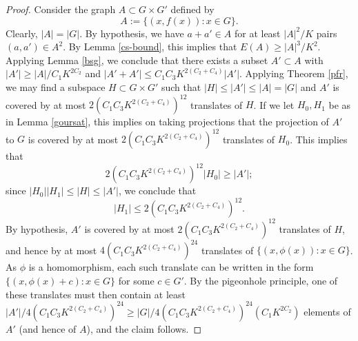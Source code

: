 \begin{proof} Consider the graph $A \subset G \times G'$ defined by
$$ A := \{ (x,f(x)): x \in G \}.$$
Clearly, $|A| = |G|$.  By hypothesis, we have $a+a' \in A$ for at least $|A|^2/K$ pairs $(a,a') \in A^2$.  By Lemma \ref{cs-bound}, this implies that $E(A) \geq |A|^3/K^2$.  Applying Lemma \ref{bsg}, we conclude that there exists a subset $A' \subset A$ with $|A'| \geq |A|/C_1 K^{2C_2}$ and $|A'+A'| \leq C_1C_3 K^{2(C_2+C_4)} |A'|$.  Applying Theorem \ref{pfr}, we may find a subspace $H \subset G \times G'$ such that $|H| \leq |A'| \leq |A| = |G|$ and $A'$ is covered by at most $2 (C_1C_3 K^{2(C_2+C_4)})^{12}$ translates of $H$.  If we let $H_0,H_1$ be as in Lemma \ref{goursat}, this implies on taking projections that the projection of $A'$ to $G$ is covered by at most $2 (C_1C_3 K^{2(C_2+C_4)})^{12}$ translates of $H_0$.  This implies that
$$ 2 (C_1C_3 K^{2(C_2+C_4)})^{12} |H_0| \geq |A'|;$$
since $|H_0| |H_1| \leq |H| \leq |A'|$, we conclude that
$$ |H_1| \leq 2(C_1C_3 K^{2(C_2+C_4)})^{12}.$$
By hypothesis, $A'$ is covered by at most $2(C_1C_3 K^{2(C_2+C_4)})^{12}$ translates of $H$, and hence by at most $4(C_1C_3 K^{2(C_2+C_4)})^{24}$ translates of $\{ (x,\phi(x)): x \in G \}$.  As $\phi$ is a homomorphism, each such translate can be written in the form $\{ (x,\phi(x)+c): x \in G \}$ for some $c \in G'$.  By the pigeonhole principle, one of these translates must then contain at least
$|A'|/4(C_1C_3 K^{2(C_2+C_4)})^{24} \geq |G| / 4 (C_1C_3 K^{2(C_2+C_4)})^{24} (C_1 K^{2C_2})$ elements of $A'$ (and hence of $A$), and the claim follows.
\end{proof}
